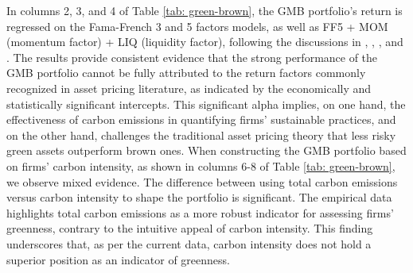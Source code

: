\documentclass[12pt]{article}
\begin{document}
In columns 2, 3, and 4 of Table \ref{tab: green-brown}, the GMB portfolio's return is regressed on the Fama-French 3 and 5 factors models, as well as FF5 + MOM (momentum factor) + LIQ (liquidity factor), following the discussions in \citet{fama2015five}, \citet{fama1993common}, \citet{jegadeesh1993returns}, and \citet{pastor2003liquidity}. The results provide consistent evidence that the strong performance of the GMB portfolio cannot be fully attributed to the return factors commonly recognized in asset pricing literature, as indicated by the economically and statistically significant intercepts. This significant alpha implies, on one hand, the effectiveness of carbon emissions in quantifying firms' sustainable practices, and on the other hand, challenges the traditional asset pricing theory that less risky green assets outperform brown ones. When constructing the GMB portfolio based on firms' carbon intensity, as shown in columns 6-8 of Table \ref{tab: green-brown}, we observe mixed evidence. The difference between using total carbon emissions versus carbon intensity to shape the portfolio is significant. The empirical data highlights total carbon emissions as a more robust indicator for assessing firms' greenness, contrary to the intuitive appeal of carbon intensity. This finding underscores that, as per the current data, carbon intensity does not hold a superior position as an indicator of greenness.
\end{document}
